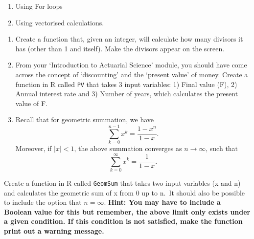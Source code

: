 \documentclass[
]{book}
\providecommand{\tightlist}{%
  \setlength{\itemsep}{0pt}\setlength{\parskip}{0pt}}
\theoremstyle{definition}
\theoremstyle{definition}
\theoremstyle{definition}
\theoremstyle{definition}
\theoremstyle{remark}
\begin{document}
\begin{enumerate}
\def\labelenumi{\roman{enumi}.}
\tightlist
\item
  Using For loops
\item
  Using vectorised calculations.
\end{enumerate}

\begin{enumerate}
\def\labelenumi{\arabic{enumi}.}
\setcounter{enumi}{1}
\item
  Create a function that, given an integer, will calculate how many divisors it has (other than 1 and itself). Make the divisors appear on the screen.
\item
  From your `Introduction to Actuarial Science' module, you should have come across the concept of `discounting' and the `present value' of money. Create a function in R called \texttt{PV} that takes 3 input variables: 1) Final value (F), 2) Annual interest rate and 3) Number of years, which calculates the present value of F.
\item
  Recall that for geometric summation, we have
  \begin{equation*}
  \sum_{k = 0}^{n-1} x^k = \frac{1-x^n}{1-x}.
  \end{equation*}
  Moreover, if \(|x| < 1\), the above summation converges as \(n \rightarrow \infty\), such that
  \begin{equation*}
  \sum_{k = 0}^{\infty} x^k = \frac{1}{1-x}.
  \end{equation*}
\end{enumerate}

Create a function in R called \texttt{GeomSum} that takes two input variables (x and n) and calculates the geometric sum of x from 0 up to n.~It should also be possible to include the option that \(n = \infty\).
\textbf{Hint: You may have to include a Boolean value for this but remember, the above limit only exists under a given condition. If this condition is not satisfied, make the function print out a warning message.}
\end{document}
